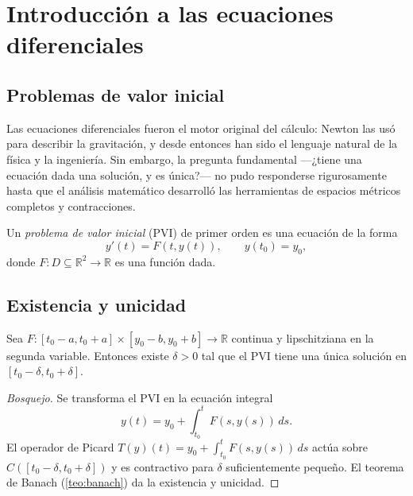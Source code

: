 \chapter{Introducción a las ecuaciones diferenciales}
\label{ch:ecuaciones-diferenciales}

\section{Problemas de valor inicial}

Las ecuaciones diferenciales fueron el motor original del cálculo: Newton las usó para describir la gravitación, y desde entonces han sido el lenguaje natural de la física y la ingeniería. Sin embargo, la pregunta fundamental ---¿tiene una ecuación dada una solución, y es única?--- no pudo responderse rigurosamente hasta que el análisis matemático desarrolló las herramientas de espacios métricos completos y contracciones.

\begin{definition}
\label{def:pvi}
Un \emph{problema de valor inicial} (PVI) de primer orden es una ecuación de la forma
\[
  y'(t)=F(t,y(t)),\qquad y(t_0)=y_0,
\]
donde $F\colon D\subseteq\mathbb{R}^2\to\mathbb{R}$ es una función dada.
\end{definition}

\section{Existencia y unicidad}

\begin{theorem}
\label{teo:picard}
Sea $F\colon[t_0-a,t_0+a]\times[y_0-b,y_0+b]\to\mathbb{R}$ continua y lipschitziana en la segunda variable. Entonces existe $\delta>0$ tal que el PVI tiene una única solución en $[t_0-\delta,t_0+\delta]$.
\end{theorem}
\begin{proof}[Bosquejo]
Se transforma el PVI en la ecuación integral
\[
  y(t)=y_0+\int_{t_0}^{t}F(s,y(s))\,ds.
\]
El operador de Picard $T(y)(t)=y_0+\int_{t_0}^t F(s,y(s))\,ds$ actúa sobre $C([t_0-\delta,t_0+\delta])$ y es contractivo para $\delta$ suficientemente pequeño. El teorema de Banach (\cref{teo:banach}) da la existencia y unicidad.
\end{proof}

